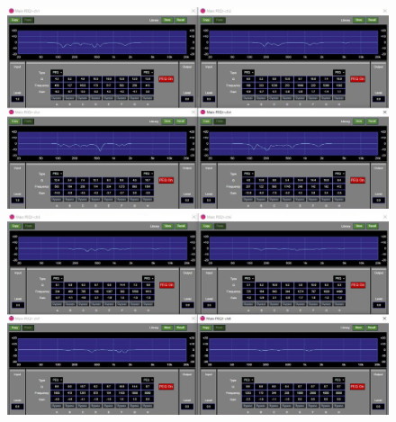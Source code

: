 \documentclass[11pt,a4j]{jreport}
\begin{document}
\begin{figure}[H]
  \begin{minipage}[b]{.5\linewidth}
    \centering
    \includegraphics[width=.9\linewidth]{images/experimentField/afcParameters/03gamma/03autoEQ1.jpg}
  \end{minipage}%
  \begin{minipage}[b]{.5\linewidth}
    \centering
    \includegraphics[width=.9\linewidth]{images/experimentField/afcParameters/03gamma/03autoEQ2.jpg}
  \end{minipage}


\end{figure}
\end{document}
